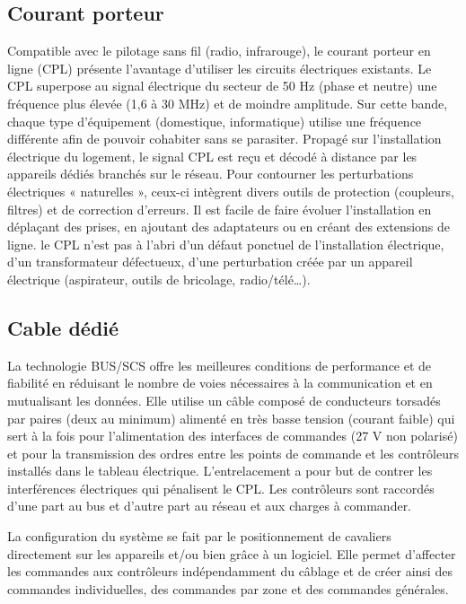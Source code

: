 \documentclass[12pt]{article}
\begin{document}
\subsection{Courant porteur}
Compatible avec le pilotage sans fil (radio, infrarouge), le courant porteur en ligne (CPL) présente l’avantage d’utiliser les circuits électriques existants. Le CPL superpose au signal électrique du secteur de 50 Hz (phase et neutre) une fréquence plus élevée (1,6 à 30 MHz) et de moindre amplitude. Sur cette bande, chaque type d’équipement (domestique, informatique) utilise une fréquence différente afin de pouvoir cohabiter sans se parasiter. Propagé sur l’installation électrique du logement, le signal CPL est reçu et décodé à distance par les appareils dédiés branchés sur le réseau. Pour contourner les perturbations électriques « naturelles », ceux-ci intègrent divers outils de protection (coupleurs, filtres) et de correction d’erreurs. Il est facile de faire évoluer l’installation en déplaçant des prises, en ajoutant des adaptateurs ou en créant des extensions de ligne. le CPL n’est pas à l’abri d’un défaut ponctuel de l’installation électrique, d’un transformateur défectueux, d’une perturbation créée par un appareil électrique (aspirateur, outils de bricolage, radio/télé…).

\subsection{Cable dédié}
La technologie BUS/SCS offre les meilleures conditions de performance et de fiabilité en réduisant le nombre de voies nécessaires à la communication et en mutualisant les données. Elle utilise un câble composé de conducteurs torsadés par paires (deux au minimum) alimenté en très basse tension (courant faible) qui sert à la fois pour l'alimentation des interfaces de commandes (27 V non polarisé) et pour la transmission des ordres entre les points de commande et les contrôleurs installés dans le tableau électrique. L’entrelacement a pour but de contrer les interférences électriques qui pénalisent le CPL. Les contrôleurs sont raccordés d'une part au bus et d'autre part au réseau et aux charges à commander.

La configuration du système se fait par le positionnement de cavaliers directement sur les appareils et/ou bien grâce à un logiciel. Elle permet d'affecter les commandes aux contrôleurs indépendamment du câblage et de créer ainsi des commandes individuelles, des commandes par zone et des commandes générales.
\end{document}
